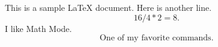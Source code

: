 \documentclass[11pt,letterpaper]{article}
\begin{document}
	This is a sample LaTeX document.
Here is another line.
$$
16 / 4 * 2 = 8.
$$	
I like Math Mode.
$$
\textrm{One of my favorite commands.}
$$
\end{document}
